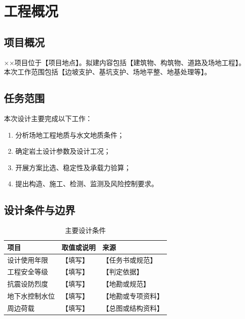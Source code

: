 \documentclass[UTF8,zihao=-4,oneside]{ctexrep}
\newcommand{\ProjectName}{××项目}
\newcommand{\placeholder}[1]{\textcolor{documentblack}{【#1】}}
\begin{document}
\clearpage
{}
\tableofcontents
\clearpage
\listoffigures
{}
\clearpage
\listoftables
{}
\clearpage
{}

\chapter{工程概况}

\section{项目概况}
\ProjectName 位于\placeholder{项目地点}。拟建内容包括\placeholder{建筑物、构筑物、道路及场地工程}。本次工作范围包括\placeholder{边坡支护、基坑支护、场地平整、地基处理等}。

\section{任务范围}
本次设计主要完成以下工作：
\begin{enumerate}
  \item 分析场地工程地质与水文地质条件；
  \item 确定岩土设计参数及设计工况；
  \item 开展方案比选、稳定性及承载力验算；
  \item 提出构造、施工、检测、监测及风险控制要求。
\end{enumerate}

\section{设计条件与边界}
\begin{table}[H]
  \centering
  \caption{主要设计条件}
  \label{tab:design-condition}
  \begin{tabularx}{\textwidth}{p{35mm}Xp{35mm}}
    \toprule
    项目 & 取值或说明 & 来源 \\
    \midrule
    设计使用年限 & \placeholder{填写} & \placeholder{任务书或规范} \\
    工程安全等级 & \placeholder{填写} & \placeholder{判定依据} \\
    抗震设防烈度 & \placeholder{填写} & \placeholder{地勘或规范} \\
    地下水控制水位 & \placeholder{填写} & \placeholder{地勘或专项资料} \\
    周边荷载 & \placeholder{填写} & \placeholder{总图或结构资料} \\
    \bottomrule
  \end{tabularx}
\end{table}
\end{document}
